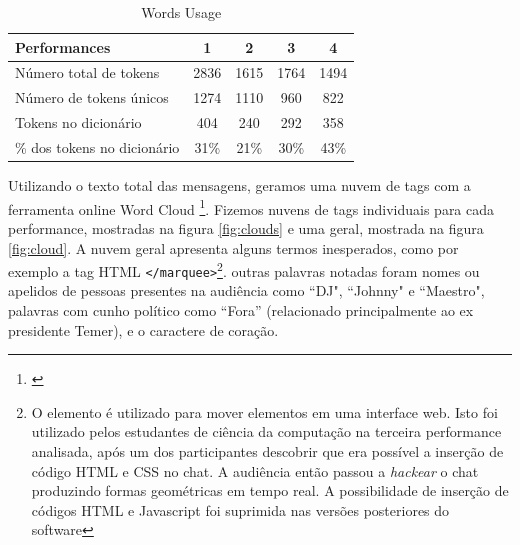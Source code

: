 \begin{table}[ht!]
\caption{Words Usage}{%
\begin{tabular}{@{}lcccc@{}}
\hline
Performances & 1 & 2 & 3 & 4 \\
\hline
Número total de tokens&     2836&   1615&  1764&   1494\\
Número de tokens únicos& 1274& 1110& 960& 822\\
Tokens no dicionário &      404&   240&  292&   358\\
\% dos tokens no dicionário &       31\%&   21\%&  30\%&   43\%\\
\end{tabular}}
\label{tab:words}
\end{table}

Utilizando o texto total das mensagens, geramos uma nuvem de tags com a ferramenta online Word Cloud \footnote{\cite{JasonDavies}}. Fizemos nuvens de tags individuais para cada performance, mostradas na figura \ref{fig:clouds} e uma geral, mostrada na figura \ref{fig:cloud}. A nuvem geral apresenta alguns termos inesperados, como por exemplo a tag HTML \texttt{</marquee>}\footnote{O elemento é utilizado para mover elementos em uma interface web. Isto foi utilizado pelos estudantes de ciência da computação na terceira performance analisada, após um dos participantes descobrir que era possível a inserção de código HTML e CSS no chat. A audiência então passou a \emph{hackear} o chat produzindo formas geométricas em tempo real. A possibilidade de inserção de códigos HTML e Javascript foi suprimida nas versões posteriores do software}. outras palavras notadas foram nomes ou apelidos de pessoas presentes na audiência como ``DJ", ``Johnny" e ``Maestro", palavras com cunho político como ``Fora'' (relacionado principalmente ao ex presidente Temer), e o caractere de coração. 



